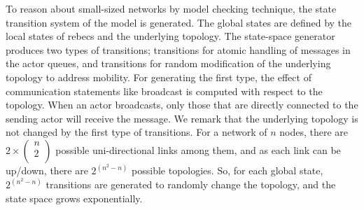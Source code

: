 To reason about small-sized networks by model checking technique, the state transition system of the model is generated. The global states %
are defined by the local states of rebecs and the underlying topology. The state-space generator produces two types of transitions; transitions for atomic handling of messages in the actor queues, and transitions for random modification of the underlying topology to address mobility. For generating the first type, the effect of communication statements like broadcast is computed with respect to the topology. When an actor broadcasts, only those that are directly connected to the sending actor will receive the message. We remark that the underlying topology is not changed by the first type of transitions.   %
For a network of $n$ nodes, there are $2\times \begin{pmatrix}
n \\
2 \\
\end{pmatrix}$ possible uni-directional links among them, and as each link can be up/down, there are $2^{(n^2-n)}$ possible topologies. %
So, for each global state, $2^{(n^2-n)}$ transitions are generated to randomly change the topology, and the state space grows exponentially. %

